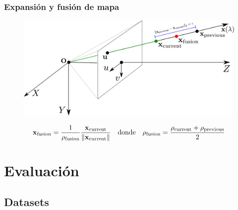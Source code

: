 \documentclass[compress]{beamer}
\begin{document}
\begin{frame}
	\frametitle{Expansión y fusión de mapa}
	\begin{figure}[htb]
		\centering
		\includegraphics[width=\columnwidth]{images/map_fusion.pdf}
	\end{figure}
	
	\begin{equation*}
		\boldsymbol{\mathbf{x}}_{\mathrm{\mathrm{fusion}}} = \dfrac{1}{\rho_\mathrm{\mathrm{fusion}}} \dfrac{\boldsymbol{\mathbf{x}}_{\mathrm{\mathrm{current}}}}{\left\lVert\boldsymbol{\mathbf{x}}_{\mathrm{\mathrm{current}}}\right\rVert}
		\quad \text{donde} \quad 
		\rho_{\mathrm{fusion}} = \dfrac{\rho_{\mathrm{current}} + \rho_{\mathrm{previous}}}{2}
	\end{equation*}
\end{frame}


\section{Evaluación}

\subsection{Datasets}
\end{document}
